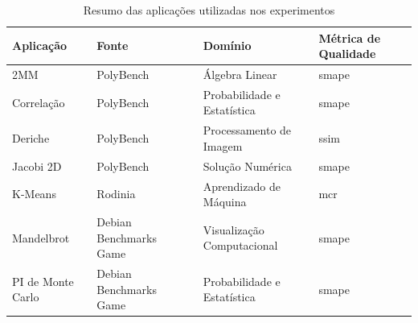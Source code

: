 \begin{table}[htb]
	\centering
	\caption{Resumo das aplicações utilizadas nos experimentos}
	\begin{tabular}{|l|p{3.5cm}|l|l|}
		\hline
		\textbf{Aplicação} & \textbf{Fonte}                                     & \textbf{Domínio}            & \textbf{Métrica de Qualidade} \\
		\hline
		2MM                & PolyBench~\cite{polybench}                         & Álgebra Linear              & \gls{smape}                   \\
		\hline
		Correlação         & PolyBench~\cite{polybench}                         & Probabilidade e Estatística & \gls{smape}                   \\
		\hline
		Deriche            & PolyBench~\cite{polybench}                         & Processamento de Imagem     & \gls{ssim}                    \\
		\hline
		Jacobi 2D          & PolyBench~\cite{polybench}                         & Solução Numérica            & \gls{smape}                   \\
		\hline
		K-Means            & Rodinia~\cite{rodinia}                             & Aprendizado de Máquina      & \gls{mcr}                     \\
		\hline
		Mandelbrot         & Debian Benchmarks Game~\cite{debianBenchmarksGame} & Visualização Computacional  & \gls{smape}                   \\
		\hline
		PI de Monte Carlo  & Debian Benchmarks Game~\cite{debianBenchmarksGame} & Probabilidade e Estatística & \gls{smape}                   \\
		\hline
	\end{tabular}
	\fonte{}
	\label{tab:benchmarks}
\end{table}
